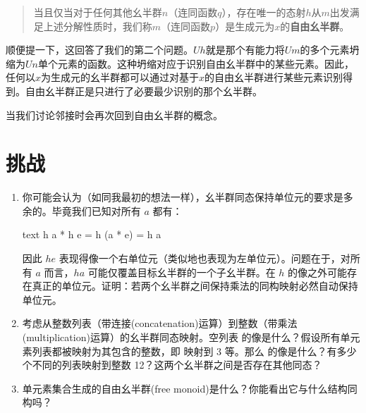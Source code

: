 \begin{quote}
  当且仅当对于任何其他幺半群$n$（连同函数$q$），存在唯一的态射$h$从$m$出发满足上述分解性质时，我们称$m$（连同函数$p$）是生成元为$x$的\textbf{自由幺半群}。
\end{quote}
顺便提一下，这回答了我们的第二个问题。$U h$就是那个有能力将$U m$的多个元素坍缩为$U n$单个元素的函数。这种坍缩对应于识别自由幺半群中的某些元素。因此，任何以$x$为生成元的幺半群都可以通过对基于$x$的自由幺半群进行某些元素识别得到。自由幺半群正是只进行了必要最少识别的那个幺半群。

当我们讨论邻接时会再次回到自由幺半群的概念。

\section{挑战}

\begin{enumerate}
  \tightlist
  \item
        你可能会认为（如同我最初的想法一样），幺半群同态保持单位元的要求是多余的。毕竟我们已知对所有 $a$ 都有：

        \begin{snip}{text}
h a * h e = h (a * e) = h a
\end{snip}
        因此 $h e$ 表现得像一个右单位元（类似地也表现为左单位元）。问题在于，对所有 $a$ 而言，$h a$ 可能仅覆盖目标幺半群的一个子幺半群。在 $h$ 的像之外可能存在真正的单位元。证明：若两个幺半群之间保持乘法的同构映射必然自动保持单位元。
  \item
        考虑从整数列表（带连接(concatenation)运算）到整数（带乘法(multiplication)运算）的幺半群同态映射。空列表 \code{{[}{]}} 的像是什么？假设所有单元素列表都被映射为其包含的整数，即 \code{{[}3{]}} 映射到 3 等。那么 \code{{[}1, 2, 3, 4{]}} 的像是什么？有多少个不同的列表映射到整数 12？这两个幺半群之间是否存在其他同态？
  \item
        单元素集合生成的自由幺半群(free monoid)是什么？你能看出它与什么结构同构吗？
\end{enumerate}
